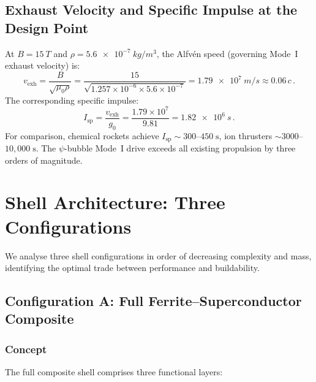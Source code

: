 \documentclass[11pt,a4paper]{article}
\begin{document}
\subsection{Exhaust Velocity and Specific Impulse at the Design Point}

At $B = \SI{15}{T}$ and $\rho = \SI{5.6e-7}{kg/m^3}$, the Alfv\'en speed
(governing Mode~I exhaust velocity) is:
\begin{equation}\label{eq:v_exh}
v_{\mathrm{exh}} = \frac{B}{\sqrt{\mu_0 \rho}}
= \frac{15}{\sqrt{1.257 \times 10^{-6} \times 5.6 \times 10^{-7}}}
= \SI{1.79e7}{m/s} \approx 0.06\,c\,.
\end{equation}
The corresponding specific impulse:
\begin{equation}
I_{\mathrm{sp}} = \frac{v_{\mathrm{exh}}}{g_0}
= \frac{1.79 \times 10^7}{9.81} = \SI{1.82e6}{s}\,.
\end{equation}
For comparison, chemical rockets achieve $I_{\mathrm{sp}} \sim 300$--$450\;\mathrm{s}$,
ion thrusters $\sim 3000$--$10{,}000\;\mathrm{s}$. The $\psi$-bubble Mode~I drive
exceeds all existing propulsion by three orders of magnitude.

\section{Shell Architecture: Three Configurations}\label{sec:architectures}

We analyse three shell configurations in order of decreasing complexity and
mass, identifying the optimal trade between performance and buildability.

\subsection{Configuration A: Full Ferrite--Superconductor Composite}

\subsubsection{Concept}

The full composite shell comprises three functional layers:
\end{document}
